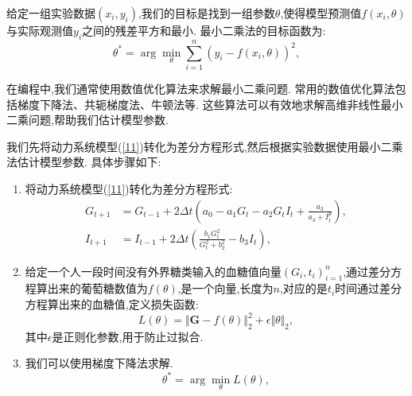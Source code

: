 \begin{defn}[最小二乘法]
    给定一组实验数据$(x_i, y_i)$,我们的目标是找到一组参数$\theta$,使得模型预测值$f(x_i, \theta)$与实际观测值$y_i$之间的残差平方和最小. 最小二乘法的目标函数为:
    \begin{equation}
        \theta^* = \arg\min_{\theta} \sum_{i=1}^{n} (y_i - f(x_i, \theta))^2,
    \end{equation}
\end{defn}

在编程中,我们通常使用数值优化算法来求解最小二乘问题. 常用的数值优化算法包括梯度下降法、共轭梯度法、牛顿法等. 这些算法可以有效地求解高维非线性最小二乘问题,帮助我们估计模型参数. 

我们先将动力系统模型(\ref{11})转化为差分方程形式,然后根据实验数据使用最小二乘法估计模型参数. 具体步骤如下:

\begin{enumerate}
    \item 将动力系统模型(\ref{11})转化为差分方程形式:
          \begin{equation}
              \begin{aligned}
                  G_{t+1} & = G_{t-1} + 2\Delta t \left(a_0-a_1G_t-a_2G_tI_t+\frac{a_3}{a_4+I_t^p}\right), \\
                  I_{t+1} & = I_{t-1} + 2\Delta t \left(\frac{b_1 G_t^2}{G_t^2 + b_2^2} - b_3 I_t\right),
              \end{aligned}
          \end{equation}
    \item 给定一个人一段时间没有外界糖类输入的血糖值向量$(G_i,t_i)_{i=1}^n$,通过差分方程算出来的葡萄糖数值为$f(\theta)$,是一个向量,长度为$n$,对应的是$t_i$时间通过差分方程算出来的血糖值,定义损失函数:
          \begin{equation}
              L(\theta) = \Vert\mathbf{G}-f(\theta) \Vert_2^2+\epsilon\Vert \theta \Vert_2,
          \end{equation}
          其中$\epsilon$是正则化参数,用于防止过拟合. 
    \item 我们可以使用梯度下降法求解. 
          \begin{equation}
              \theta^* = \arg\min_{\theta} L(\theta),
          \end{equation}
\end{enumerate}

